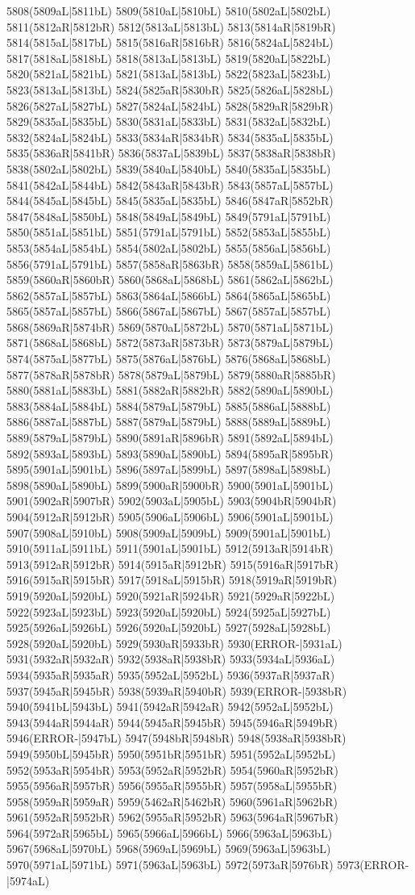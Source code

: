 5808(5809aL|5811bL) 5809(5810aL|5810bL) 5810(5802aL|5802bL) 5811(5812aR|5812bR) 5812(5813aL|5813bL) 5813(5814aR|5819bR) 5814(5815aL|5817bL) 5815(5816aR|5816bR) 5816(5824aL|5824bL) 5817(5818aL|5818bL) 5818(5813aL|5813bL) 5819(5820aL|5822bL) 5820(5821aL|5821bL) 5821(5813aL|5813bL) 5822(5823aL|5823bL) 5823(5813aL|5813bL) 5824(5825aR|5830bR) 5825(5826aL|5828bL) 5826(5827aL|5827bL) 5827(5824aL|5824bL) 5828(5829aR|5829bR) 5829(5835aL|5835bL) 5830(5831aL|5833bL) 5831(5832aL|5832bL) 5832(5824aL|5824bL) 5833(5834aR|5834bR) 5834(5835aL|5835bL) 5835(5836aR|5841bR) 5836(5837aL|5839bL) 5837(5838aR|5838bR) 5838(5802aL|5802bL) 5839(5840aL|5840bL) 5840(5835aL|5835bL) 5841(5842aL|5844bL) 5842(5843aR|5843bR) 5843(5857aL|5857bL) 5844(5845aL|5845bL) 5845(5835aL|5835bL) 5846(5847aR|5852bR) 5847(5848aL|5850bL) 5848(5849aL|5849bL) 5849(5791aL|5791bL) 5850(5851aL|5851bL) 5851(5791aL|5791bL) 5852(5853aL|5855bL) 5853(5854aL|5854bL) 5854(5802aL|5802bL) 5855(5856aL|5856bL) 5856(5791aL|5791bL) 5857(5858aR|5863bR) 5858(5859aL|5861bL) 5859(5860aR|5860bR) 5860(5868aL|5868bL) 5861(5862aL|5862bL) 5862(5857aL|5857bL) 5863(5864aL|5866bL) 5864(5865aL|5865bL) 5865(5857aL|5857bL) 5866(5867aL|5867bL) 5867(5857aL|5857bL) 5868(5869aR|5874bR) 5869(5870aL|5872bL) 5870(5871aL|5871bL) 5871(5868aL|5868bL) 5872(5873aR|5873bR) 5873(5879aL|5879bL) 5874(5875aL|5877bL) 5875(5876aL|5876bL) 5876(5868aL|5868bL) 5877(5878aR|5878bR) 5878(5879aL|5879bL) 5879(5880aR|5885bR) 5880(5881aL|5883bL) 5881(5882aR|5882bR) 5882(5890aL|5890bL) 5883(5884aL|5884bL) 5884(5879aL|5879bL) 5885(5886aL|5888bL) 5886(5887aL|5887bL) 5887(5879aL|5879bL) 5888(5889aL|5889bL) 5889(5879aL|5879bL) 5890(5891aR|5896bR) 5891(5892aL|5894bL) 5892(5893aL|5893bL) 5893(5890aL|5890bL) 5894(5895aR|5895bR) 5895(5901aL|5901bL) 5896(5897aL|5899bL) 5897(5898aL|5898bL) 5898(5890aL|5890bL) 5899(5900aR|5900bR) 5900(5901aL|5901bL) 5901(5902aR|5907bR) 5902(5903aL|5905bL) 5903(5904bR|5904bR) 5904(5912aR|5912bR) 5905(5906aL|5906bL) 5906(5901aL|5901bL) 5907(5908aL|5910bL) 5908(5909aL|5909bL) 5909(5901aL|5901bL) 5910(5911aL|5911bL) 5911(5901aL|5901bL) 5912(5913aR|5914bR) 5913(5912aR|5912bR) 5914(5915aR|5912bR) 5915(5916aR|5917bR) 5916(5915aR|5915bR) 5917(5918aL|5915bR) 5918(5919aR|5919bR) 5919(5920aL|5920bL) 5920(5921aR|5924bR) 5921(5929aR|5922bL) 5922(5923aL|5923bL) 5923(5920aL|5920bL) 5924(5925aL|5927bL) 5925(5926aL|5926bL) 5926(5920aL|5920bL) 5927(5928aL|5928bL) 5928(5920aL|5920bL) 5929(5930aR|5933bR) 5930(ERROR-|5931aL) 5931(5932aR|5932aR) 5932(5938aR|5938bR) 5933(5934aL|5936aL) 5934(5935aR|5935aR) 5935(5952aL|5952bL) 5936(5937aR|5937aR) 5937(5945aR|5945bR) 5938(5939aR|5940bR) 5939(ERROR-|5938bR) 5940(5941bL|5943bL) 5941(5942aR|5942aR) 5942(5952aL|5952bL) 5943(5944aR|5944aR) 5944(5945aR|5945bR) 5945(5946aR|5949bR) 5946(ERROR-|5947bL) 5947(5948bR|5948bR) 5948(5938aR|5938bR) 5949(5950bL|5945bR) 5950(5951bR|5951bR) 5951(5952aL|5952bL) 5952(5953aR|5954bR) 5953(5952aR|5952bR) 5954(5960aR|5952bR) 5955(5956aR|5957bR) 5956(5955aR|5955bR) 5957(5958aL|5955bR) 5958(5959aR|5959aR) 5959(5462aR|5462bR) 5960(5961aR|5962bR) 5961(5952aR|5952bR) 5962(5955aR|5952bR) 5963(5964aR|5967bR) 5964(5972aR|5965bL) 5965(5966aL|5966bL) 5966(5963aL|5963bL) 5967(5968aL|5970bL) 5968(5969aL|5969bL) 5969(5963aL|5963bL) 5970(5971aL|5971bL) 5971(5963aL|5963bL) 5972(5973aR|5976bR) 5973(ERROR-|5974aL) 